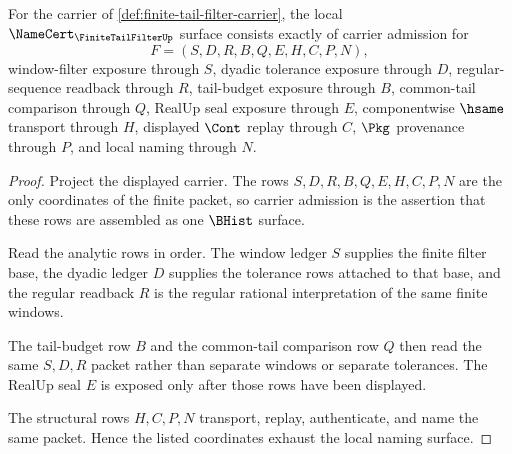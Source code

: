 \begin{theorem}
\label{thm:finite-tail-filter-namecert-obligations}
For the carrier of \autoref{def:finite-tail-filter-carrier}, the local $\NameCert_{\FiniteTailFilterUp}$ surface consists exactly of carrier admission for
$$
F=(S,D,R,B,Q,E,H,C,P,N),
$$
window-filter exposure through $S$, dyadic tolerance exposure through $D$, regular-sequence readback through $R$, tail-budget exposure through $B$, common-tail comparison through $Q$, RealUp seal exposure through $E$, componentwise $\hsame$ transport through $H$, displayed $\Cont$ replay through $C$, $\Pkg$ provenance through $P$, and local naming through $N$.
\end{theorem}
\begin{proof}
Project the displayed carrier. The rows $S,D,R,B,Q,E,H,C,P,N$ are the only coordinates of the finite packet, so carrier admission is the assertion that these rows are assembled as one $\BHist$ surface.

Read the analytic rows in order. The window ledger $S$ supplies the finite filter base, the dyadic ledger $D$ supplies the tolerance rows attached to that base, and the regular readback $R$ is the regular rational interpretation of the same finite windows.

The tail-budget row $B$ and the common-tail comparison row $Q$ then read the same $S,D,R$ packet rather than separate windows or separate tolerances. The RealUp seal $E$ is exposed only after those rows have been displayed.

The structural rows $H,C,P,N$ transport, replay, authenticate, and name the same packet. Hence the listed coordinates exhaust the local naming surface.
\end{proof}

